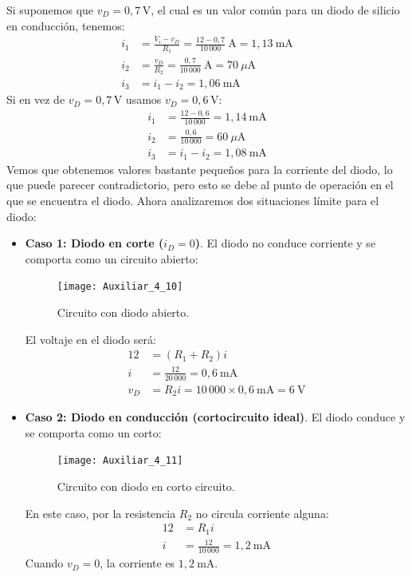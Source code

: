 \documentclass[
  11pt,
  letterpaper,
   addpoints,
   answers
  ]{exam}
\begin{document}
\begin{questions}
\begin{solution}
 Si suponemos que $v_D = 0{,}7\,\mathrm{V}$, el cual es un valor común para un diodo de silicio en conducción, tenemos:
  \begin{align*}
    i_1 &= \frac{V_i - v_D}{R_1} = \frac{12 - 0{,}7}{10\,000}\ \mathrm{A} = 1{,}13\ \mathrm{mA} \\
    i_2 &= \frac{v_D}{R_2} = \frac{0{,}7}{10\,000}\ \mathrm{A} = 70\ \mu\mathrm{A} \\
    i_3 &= i_1 - i_2 = 1{,}06\ \mathrm{mA}
  \end{align*}
  Si en vez de $v_D = 0{,}7\,\mathrm{V}$ usamos $v_D = 0{,}6\,\mathrm{V}$:
  \begin{align*}
    i_1 &= \frac{12 - 0{,}6}{10\,000} = 1{,}14\ \mathrm{mA} \\
    i_2 &= \frac{0{,}6}{10\,000} = 60\ \mu\mathrm{A} \\
    i_3 &= i_1 - i_2 = 1{,}08\ \mathrm{mA}
  \end{align*}
Vemos que obtenemos valores bastante pequeños para la corriente del diodo, lo que puede parecer contradictorio, pero esto se debe al punto de operación en el que se encuentra el diodo. Ahora analizaremos dos situaciones límite para el diodo:
\begin{itemize}
    \item \textbf{Caso 1: Diodo en corte ($i_D = 0$)}. El diodo no conduce corriente y se comporta como un circuito abierto:
    \begin{figure}[H]
      \centering
      \texttt{[image: Auxiliar\_4\_10]}
      \caption{Circuito con diodo abierto.}
      \label{fig:th_norton_2}
    \end{figure}
  El voltaje en el diodo será:
    \begin{align*}
        12 &= (R_1 + R_2)i \\
        i &= \frac{12}{20\,000} = 0{,}6\ \mathrm{mA} \\
        v_D &= R_2 i = 10\,000 \times 0{,}6\ \mathrm{mA} = 6\ \mathrm{V}
    \end{align*}
    \item \textbf{Caso 2: Diodo en conducción (cortocircuito ideal)}. El diodo conduce y se comporta como un corto:
    \begin{figure}[H]
      \centering
      \texttt{[image: Auxiliar\_4\_11]}
      \caption{Circuito con diodo en corto circuito.}
      \label{fig:th_norton_3}
    \end{figure}
  En este caso, por la resistencia $R_2$ no circula corriente alguna:
    \begin{align*}
        12 &= R_1 i \\
        i &= \frac{12}{10\,000} = 1{,}2\ \mathrm{mA}
    \end{align*}
    Cuando $v_D = 0$, la corriente es $1{,}2\ \mathrm{mA}$.
\end{itemize}


\end{solution}
\end{questions}
\end{document}
